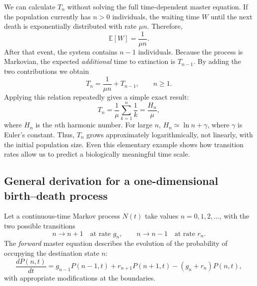 We can calculate $T_n$ without solving the full time-dependent master
equation. If the population currently has $n>0$ individuals, the waiting
time $W$ until the next death is exponentially distributed with rate $\mu n$.
Therefore,
\begin{equation}
 \mathbb{E}[W]=\frac{1}{\mu n}.
\end{equation}
After that event, the system contains $n-1$ individuals. Because the process
is Markovian, the expected \emph{additional} time to extinction is $T_{n-1}$.
By adding the two contributions we obtain
\begin{equation}
 T_n=\frac{1}{\mu n}+T_{n-1},\qquad n\geq1.
 \label{eq:mfpt-pure-death-recursion}
\end{equation}
Applying this relation repeatedly gives a simple exact result:
\begin{equation}
 \boxed{T_n=\frac{1}{\mu}\sum_{k=1}^{n}\frac{1}{k}
       =\frac{H_n}{\mu}},
 \label{eq:mfpt-pure-death-solution}
\end{equation}
where $H_n$ is the $n$th harmonic number. For large $n$,
$H_n\simeq\ln n+\gamma$, where $\gamma$ is Euler's constant. Thus,
$T_n$ grows approximately logarithmically, not linearly, with the initial
population size. Even this elementary example shows how transition rates
allow us to predict a biologically meaningful time scale.

\subsection{General derivation for a one-dimensional birth--death process}
\label{subsec:backward-derivation}
Let a continuous-time Markov process $N(t)$ take values
$n=0,1,2,\ldots$, with the two possible transitions
\begin{equation}
 n\longrightarrow n+1\quad\text{at rate }g_n,
 \qquad
 n\longrightarrow n-1\quad\text{at rate }r_n.
 \label{eq:mfpt-transition-rates}
\end{equation}
The \emph{forward} master equation describes the evolution of the
probability of occupying the destination state $n$:
\begin{equation}
 \frac{dP(n,t)}{dt}=
 g_{n-1}P(n-1,t)+r_{n+1}P(n+1,t)
 -(g_n+r_n)P(n,t),
 \label{eq:mfpt-forward}
\end{equation}
with appropriate modifications at the boundaries.

